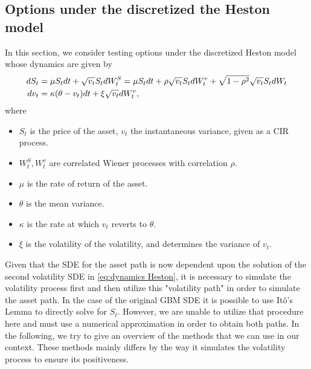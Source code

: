 \subsection{Options under the discretized the Heston model}
In this section, we consider  testing options under the discretized Heston model \cite{heston1993closed,broadie2006exact,kahl2006fast,andersen2007efficient} whose dynamics are given by
\begin{align}\label{eq:dynamics Heston}
dS_t&=\mu S_t dt+\sqrt{v_t}S_t dW_t^S= \mu S_t dt+ \rho\sqrt{v_t}S_t dW_t^v+ \sqrt{1-\rho^2} \sqrt{v_t}S_t dW_t \nonumber\\
dv_t&=\kappa (\theta-v_t)dt+\xi \sqrt{v_t} dW_t^v,
\end{align}
where 

\begin{itemize}
\item $S_t$ is the price of the asset, $v_t$ the instantaneous variance, given as  a CIR process.
\item $W_{t}^{S},W_{t}^{v}$ are correlated Wiener processes with correlation $\rho$.
\item $\mu$  is the rate of return of the asset.
\item $\theta$ is  the mean  variance.
\item $\kappa$ is the rate at which $v_t$ reverts to $\theta$.
\item $\xi$ is the volatility of the volatility, and determines the variance of $v_t$.
\end{itemize}

Given that the SDE for the asset path is now dependent  upon the solution of the second volatility SDE in \eqref{eq:dynamics Heston}, it is necessary to simulate the volatility process first and then utilize this "volatility path" in order to simulate the asset path. In the case of the original GBM SDE it is possible to use It\^o's Lemma to directly solve for $S_t$. However, we are unable to utilize that procedure here and must use a numerical approximation in order to obtain both paths. In the following, we try to give an overview of the methods that we can use in our context. These methods mainly differs by the way it simulates the volatility process to ensure its positiveness.
